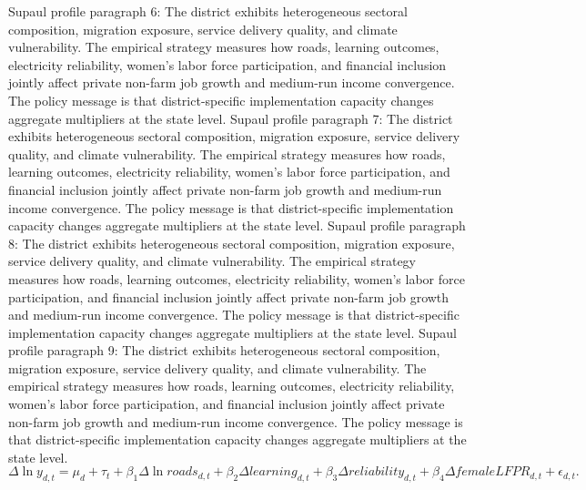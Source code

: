 \documentclass[preprint,12pt]{elsarticle}
\begin{document}
Supaul profile paragraph 6: The district exhibits heterogeneous sectoral composition, migration exposure, service delivery quality, and climate vulnerability. The empirical strategy measures how roads, learning outcomes, electricity reliability, women's labor force participation, and financial inclusion jointly affect private non-farm job growth and medium-run income convergence. The policy message is that district-specific implementation capacity changes aggregate multipliers at the state level.
Supaul profile paragraph 7: The district exhibits heterogeneous sectoral composition, migration exposure, service delivery quality, and climate vulnerability. The empirical strategy measures how roads, learning outcomes, electricity reliability, women's labor force participation, and financial inclusion jointly affect private non-farm job growth and medium-run income convergence. The policy message is that district-specific implementation capacity changes aggregate multipliers at the state level.
Supaul profile paragraph 8: The district exhibits heterogeneous sectoral composition, migration exposure, service delivery quality, and climate vulnerability. The empirical strategy measures how roads, learning outcomes, electricity reliability, women's labor force participation, and financial inclusion jointly affect private non-farm job growth and medium-run income convergence. The policy message is that district-specific implementation capacity changes aggregate multipliers at the state level.
Supaul profile paragraph 9: The district exhibits heterogeneous sectoral composition, migration exposure, service delivery quality, and climate vulnerability. The empirical strategy measures how roads, learning outcomes, electricity reliability, women's labor force participation, and financial inclusion jointly affect private non-farm job growth and medium-run income convergence. The policy message is that district-specific implementation capacity changes aggregate multipliers at the state level.
\begin{equation}\Delta \ln y_{d,t}=\mu_d+\tau_t+\beta_1\Delta\ln roads_{d,t}+\beta_2\Delta learning_{d,t}+\beta_3\Delta reliability_{d,t}+\beta_4\Delta femaleLFPR_{d,t}+\epsilon_{d,t}.\end{equation}
\end{document}
